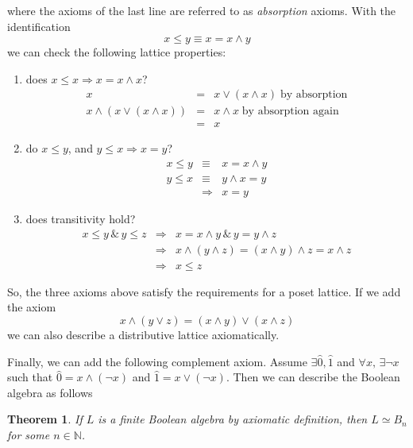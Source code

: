 \documentclass[11pt,english]{article}
\newtheorem{theorem}{Theorem}
\begin{document}
where the axioms of the last line are referred to as \emph{absorption}
axioms. With the identification \[
x\le y\equiv x=x\wedge y\]
we can check the following lattice properties: 
\begin{enumerate}
\item does $x\le x\Rightarrow x=x\wedge x$?\begin{eqnarray*}
x & = & x\vee\left(x\wedge x\right)\;\text{by absorption}\\
x\wedge\left(x\vee\left(x\wedge x\right)\right) & = & x\wedge x\;\text{by absorption again}\\
 & = & x\end{eqnarray*}

\item do $x\le y$, and $y\le x\Rightarrow x=y$?\begin{eqnarray*}
x\le y & \equiv & x=x\wedge y\\
y\le x & \equiv & y\wedge x=y\\
 & \Rightarrow & x=y\end{eqnarray*}

\item does transitivity hold?\begin{eqnarray*}
x\le y\,\&\, y\le z & \Rightarrow & x=x\wedge y\,\&\, y=y\wedge z\\
 & \Rightarrow & x\wedge\left(y\wedge z\right)=\left(x\wedge y\right)\wedge z=x\wedge z\\
 & \Rightarrow & x\le z\end{eqnarray*}

\end{enumerate}
So, the three axioms above satisfy the requirements for a poset lattice.
If we add the axiom\[
x\wedge\left(y\vee z\right)=\left(x\wedge y\right)\vee\left(x\wedge z\right)\]
we can also describe a distributive lattice axiomatically.

Finally, we can add the following complement axiom. Assume $\exists\hat{0},\hat{1}$
and $\forall x,\,\exists\neg x$ such that $\hat{0}=x\wedge\left(\neg x\right)$
and $\hat{1}=x\vee\left(\neg x\right)$. Then we can describe the
Boolean algebra as follows

\begin{theorem}

If $L$ is a finite Boolean algebra by axiomatic definition, then
$L\simeq B_{n}$ for some $n\in\mathbb{N}$.

\end{theorem}
\end{document}
